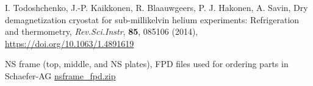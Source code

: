 \documentclass[a4paper]{article}
\begin{document}
\begin{thebibliography}{}

I. Todoshchenko, J.-P. Kaikkonen, R. Blaauwgeers, P. J. Hakonen, A. Savin,
Dry demagnetization cryostat for sub-millikelvin helium experiments: Refrigeration and thermometry,
{\it Rev.Sci.Instr}, {\bf 85}, 085106 (2014),\\
\url{https://doi.org/10.1063/1.4891619}


NS frame (top, middle, and NS plates), FPD files used for ordering parts in Schaefer-AG
\url{nsframe_fpd.zip}

\end{thebibliography}
\end{document}

